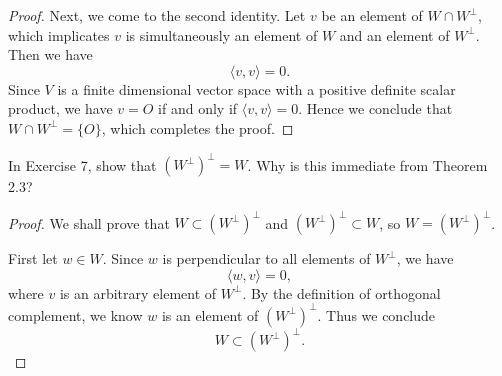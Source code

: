 {{\begin{solution}
\begin{proof}
            Next, we come to the second identity. 
            Let $v$ be an element of $W \cap W^{\perp}$, which implicates $v$ is simultaneously an element of $W$ and an element of $W^{\perp}$. 
            Then we have 
            \begin{equation*}
                \langle v, v \rangle = 0. 
            \end{equation*}
            Since $V$ is a finite dimensional vector space with a positive definite scalar product, we have $v = O$ if and only if $\langle v, v \rangle = 0$. 
            Hence we conclude that $W \cap W^{\perp} = \{ O \}$, which completes the proof. 
        \end{proof}
    \end{solution}
    \item 
    In Exercise 7, show that $(W^{\perp})^{\perp} = W$. 
    Why is this immediate from Theorem 2.3? 
    \begin{solution}
        \begin{proof}
            We shall prove that $W \subset (W^{\perp})^{\perp}$ and $(W^{\perp})^{\perp} \subset W$, so $W = (W^{\perp})^{\perp}$. 

            First let $w \in W$. 
            Since $w$ is perpendicular to all elements of $W^{\perp}$, we have 
            \begin{equation*}
                \langle w, v \rangle = 0, 
            \end{equation*}
            where $v$ is an arbitrary element of $W^{\perp}$. 
            By the definition of orthogonal complement, we know $w$ is an element of $(W^{\perp})^{\perp}$. 
            Thus we conclude 
            \begin{equation*}
                W \subset (W^{\perp})^{\perp}. 
            \end{equation*}
            

\end{proof}
\end{solution}}}
